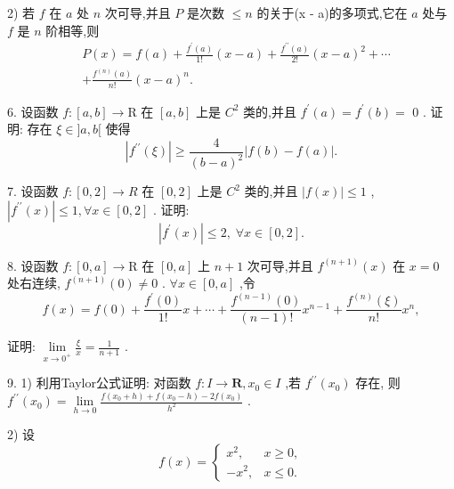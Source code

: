 2) 若 $f$ 在 $a$ 处 $n$ 次可导,并且 $P$ 是次数 $\leq  n$ 的关于(x - a)的多项式,它在 $a$ 处与 $f$ 是 $n$ 阶相等,则
\begin{align*}
	&P\left( x\right)  = f\left( a\right)  + \frac{{f}^{\prime }\left( a\right) }{1!}\left( {x - a}\right)  + \frac{{f}^{\prime \prime }\left( a\right) }{2!}{\left( x - a\right) }^{2} + \cdots\\
	&+ \frac{{f}^{\left( n\right) }\left( a\right) }{n!}{\left( x - a\right) }^{n}.
\end{align*}

6. 设函数 $f : \left\lbrack  {a,b}\right\rbrack   \rightarrow  \mathrm{R}$ 在 $\left\lbrack  {a,b}\right\rbrack$ 上是 ${C}^{2}$ 类的,并且 ${f}^{\prime }\left( a\right)  = {f}^{\prime }\left( b\right)  =$ 0 . 证明: 存在 $\xi  \in  \rbrack a,b\lbrack$ 使得
$$\left| {{f}^{\prime \prime }\left( \xi \right) }\right|  \geq  \frac{4}{{\left( b - a\right) }^{2}}\left| {f\left( b\right)  - f\left( a\right) }\right| .$$

7. 设函数 $f : \left\lbrack  {0,2}\right\rbrack   \rightarrow  R$ 在 $\left\lbrack  {0,2}\right\rbrack$ 上是 ${C}^{2}$ 类的,并且 $\left| {f\left( x\right) }\right|  \leq  1$ , $\left| {{f}^{\prime \prime }\left( x\right) }\right|  \leq  1,\forall x \in  \left\lbrack  {0,2}\right\rbrack$ . 证明:
$$\left| {{f}^{\prime }\left( x\right) }\right|  \leq  2,\;\forall x \in  \left\lbrack  {0,2}\right\rbrack  .$$

8. 设函数 $f : \left\lbrack  {0,a}\right\rbrack   \rightarrow  \mathrm{R}$ 在 $\left\lbrack  {0,a}\right\rbrack$ 上 $n + 1$ 次可导,并且 ${f}^{\left( n + 1\right) }\left( x\right)$ 在 $x = 0$ 处右连续, ${f}^{\left( n + 1\right) }\left( 0\right)  \neq  0$ . $\forall x \in  \left\lbrack  {0,a}\right\rbrack$ ,令
$$f\left( x\right)  = f\left( 0\right)  + \frac{{f}^{\prime }\left( 0\right) }{1!}x + \cdots  + \frac{{f}^{\left( n - 1\right) }\left( 0\right) }{\left( {n - 1}\right) !}{x}^{n - 1} + \frac{{f}^{\left( n\right) }\left( \xi \right) }{n!}{x}^{n},$$

证明: $\mathop{\lim }\limits_{{x \rightarrow  {0}^{ + }}}\frac{\xi }{x} = \frac{1}{n + 1}$ .

9. 1) 利用Taylor公式证明: 对函数 $f : I \rightarrow  \mathbf{R},{x}_{0} \in  I$ ,若 ${f}^{\prime \prime }\left( {x}_{0}\right)$ 存在, 则 ${f}^{\prime \prime }\left( {x}_{0}\right)  = \mathop{\lim }\limits_{{h \rightarrow  0}}\frac{f\left( {{x}_{0} + h}\right)  + f\left( {{x}_{0} - h}\right)  - {2f}\left( {x}_{0}\right) }{{h}^{2}}$ .

2) 设
$$f\left( x\right)  = \left\{  \begin{array}{ll} {x}^{2}, & x \geq  0, \\   - {x}^{2}, & x \leq  0. \end{array}\right.$$

